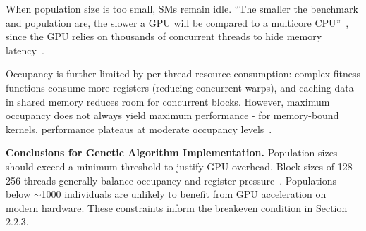 \documentclass[a4paper,14pt]{extarticle}
\begin{document}
When population size is too small, SMs remain idle. ``The smaller the benchmark and population are, the slower a GPU will be compared to a multicore CPU''~\cite{jaros2012fair}, since the GPU relies on thousands of concurrent threads to hide memory latency~\cite{pospichal2010parallel,carpentries_gpu}.

Occupancy is further limited by per-thread resource consumption: complex fitness functions consume more registers (reducing concurrent warps), and caching data in shared memory reduces room for concurrent blocks. However, maximum occupancy does not always yield maximum performance - for memory-bound kernels, performance plateaus at moderate occupancy levels~\cite{volkov2010occupancy}.

\textbf{Conclusions for Genetic Algorithm Implementation.} Population sizes should exceed a minimum threshold to justify GPU overhead. Block sizes of 128--256 threads generally balance occupancy and register pressure~\cite{nvidia_occupancy}. Populations below $\sim$1000 individuals are unlikely to benefit from GPU acceleration on modern hardware. These constraints inform the breakeven condition in Section 2.2.3.
\end{document}

